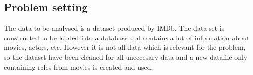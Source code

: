 \subsection{Problem setting}
The data to be analysed is a dataset produced by IMDb. The data set is constructed to be loaded into a database and contains a lot of information about movies, actors, etc. However it is not all data which is relevant for the problem, so the dataset have been cleaned for all uneccesary data and a new datafile only containing roles from movies is created and used.